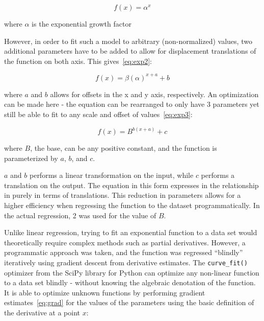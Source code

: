 \documentclass{mcmthesis}
\begin{document}
    \begin{equation}
        f(x) = \alpha^x
        \label{eq:exp}
    \end{equation}

    \noindent where $\alpha$ is the exponential growth factor

    However, in order to fit such a model to arbitrary (non-normalized) values, two additional parameters have to be added to allow for displacement translations of the function on both axis. This gives~\eqref{eq:exp2}:

    \begin{equation}
        f(x) = \beta (\alpha)^{x + a} + b
        \label{eq:exp2}
    \end{equation}

    \noindent where $a$ and $b$ allows for offsets in the x and y axis, respectively.
    An optimization can be made here - the equation can be rearranged to only have 3 parameters yet still be able to fit to any scale and offset of values~\eqref{eq:exp3}:

    \begin{equation}
        f(x) = B^{b (x + a)} + c
        \label{eq:exp3}
    \end{equation}

    \noindent where $B$, the base, can be any positive constant, and the function is parameterized by $a$, $b$, and $c$.

    $a$ and $b$ performs a linear transformation on the input, while $c$ performs a translation on the output.
    The equation in this form expresses in the relationship in purely in terms of translations.
    This reduction in parameters allows for a higher efficiency when regressing the function to the dataset programmatically.
    In the actual regression, 2 was used for the value of $B$.

    Unlike linear regression, trying to fit an exponential function to a data set would theoretically require complex methods such as partial derivatives.
    However, a programmatic approach was taken, and the function was regressed ``blindly'' iteratively using gradient descent from derivative estimates.
    The \verb|curve_fit()| optimizer from the SciPy library for Python can optimize any non-linear function to a data set blindly - without knowing the algebraic denotation of the function.
    It is able to optimize unknown functions by performing gradient estimates~\eqref{eq:grad} for the values of the parameters using the basic definition of the derivative at a point $x$:
\end{document}
